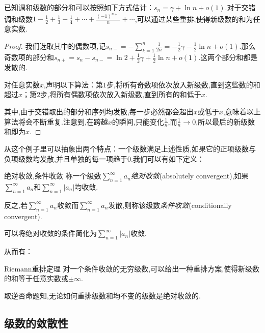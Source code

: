 \begin{example}
	已知调和级数的部分和可以按照如下方式估计：$s_n=\gamma + \ln n + o(1)$.对于交错调和级数$1-\frac{1}{2}+\frac{1}{3}-\frac{1}{4}+\cdots + \frac{(-1)^{n+1}}{n}+\cdots $,可以通过某些重排,使得新级数的和为任意实数.
\end{example}
\begin{proof}
	我们选取其中的偶数项,记$s_{n-}=-\sum_{k=1}^{n} \frac{1}{2n} = -\frac{1}{2}\gamma -\frac{1}{2}\ln n+o(1)$.那么奇数项的部分和$s_{n+}=s_n-s_{n-}=\ln 2+\frac{1}{2}\gamma + \frac{1}{2}\ln n + o(1)$.这两个部分和都是发散的.
	
	对任意实数$x$,声明以下算法：第$1$步,将所有奇数项依次放入新级数,直到这些数的和超过$x$；第$2$步,将所有偶数项依次放入新级数,直到所有的和低于$x$.
	
	其中,由于交错取出的部分和序列均发散,每一步必然都会超出$x$或低于$x$,意味着以上算法将会不断重复.注意到,在跨越$x$的瞬间,只能变化$\frac{1}{n}$,而$\frac{1}{n} \to 0$,所以最后的新级数和即为$x$.
\end{proof}

从这个例子里可以抽象出两个特点：一个级数满足上述性质,如果它的正项级数与负项级数均发散,并且单独的每一项趋于$0$.我们可以有如下定义：

\begin{definition}{绝对收敛,条件收敛}
	称一个级数$\sum_{n=1}^{\infty} a_n$\textit{绝对收敛}(absolutely convergent),如果$\sum_{n=1}^{\infty} a_n$和$\sum_{n=1}^{\infty} |a_n|$均收敛.
	
	反之,若$\sum_{n=1}^{\infty} a_n$收敛而$\sum_{n=1}^{\infty} a_n$发散,则称该级数\textit{条件收敛}(conditionally convergent).
\end{definition}
\begin{remark}
	可以将绝对收敛的条件简化为$\sum_{n=1}^{\infty} |a_n|$收敛.
\end{remark}

从而有：

\begin{theorem}{Riemann重排定理}
	对一个条件收敛的无穷级数,可以给出一种重排方案,使得新级数的和等于任意实数或$\pm \infty$.
\end{theorem}
\begin{remark}
	取逆否命题知,无论如何重排级数和均不变的级数是绝对收敛的.
\end{remark}

\subsection{级数的敛散性}

